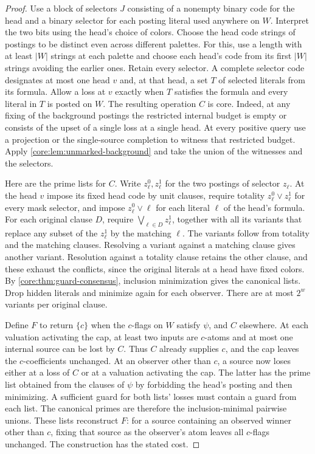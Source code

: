 \begin{proof}
Use a block of selectors $J$ consisting of a nonempty binary code
for the head and a binary selector for each posting literal used
anywhere on $W$. Interpret the two bits using the head's choice of
colors. Choose the head code strings of postings to be distinct
even across different palettes. For this, use a length with at
least $|W|$ strings at each palette and choose each head's code
from its first $|W|$ strings avoiding the earlier ones. Retain
every selector. A complete selector code designates at most one
head $v$ and, at that head, a set $T$ of selected literals from its
formula. Allow a loss at $v$ exactly when $T$ satisfies the formula
and every literal in $T$ is posted on $W$. The resulting
operation $C$ is core. Indeed, at any fixing of the background
postings the restricted internal budget is empty or consists of
the upset of a single loss at a single head. At every positive
query use a projection or the single-source completion to witness
that restricted budget. Apply \cref{core:lem:unmarked-background}
and take the union of the witnesses and the selectors.

Here are the prime lists for $C$. Write $z_\ell^0,z_\ell^1$ for the
two postings of selector $z_\ell$. At the head $v$ impose its fixed
head code by unit clauses, require totality $z_\ell^0\lor z_\ell^1$
for every mask selector, and impose $z_\ell^0\lor\ell$ for each
literal $\ell$ of the head's formula. For each original clause
$D$, require $\bigvee_{\ell\in D}z_\ell^1$, together with all its
variants that replace any subset of the $z_\ell^1$ by the matching
$\ell$. The variants follow from totality and the matching clauses.
Resolving a variant against a matching clause gives another variant.
Resolution against a totality clause retains the other clause, and
these exhaust the conflicts, since the original literals at a head
have fixed colors. By \cref{core:thm:guard-consensus}, inclusion
minimization gives the canonical lists. Drop hidden literals and
minimize again for each observer. There are at most $2^w$ variants
per original clause.

Define $F$ to return $\{c\}$ when the $c$-flags on $W$ satisfy
$\psi$, and $C$ elsewhere. At each valuation activating the cap,
at least two inputs are $c$-atoms and at most one internal source
can be lost by $C$. Thus $C$ already supplies $c$, and the cap
leaves the $c$-coefficients unchanged. At an observer other than
$c$, a source now loses either at a loss of $C$ or at a valuation
activating the cap. The latter has the prime list obtained from
the clauses of $\psi$ by forbidding the head's posting and then
minimizing. A sufficient guard for both lists' losses must contain
a guard from each list. The canonical primes are therefore the
inclusion-minimal pairwise unions. These lists reconstruct $F$:
for a source containing an observed winner other than $c$, fixing
that source as the observer's atom leaves all $c$-flags unchanged.
The construction has the stated cost.


\end{proof}
